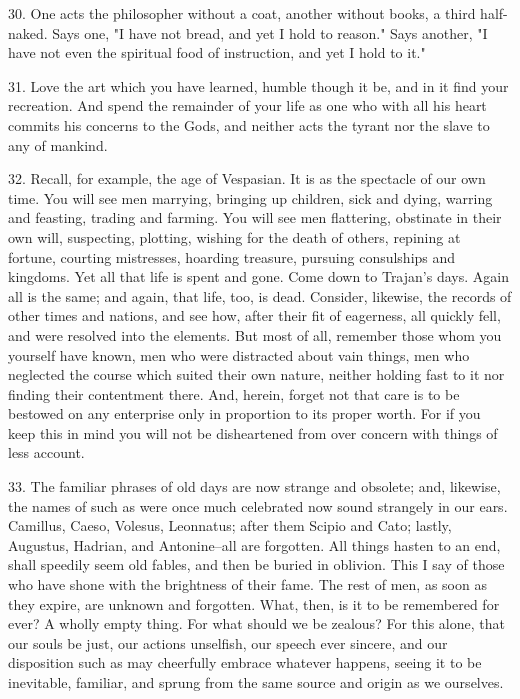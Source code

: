 \documentclass{book}
\begin{document}
30. One acts the philosopher without a coat, another without books, a
third half-naked. Says one, "I have not bread, and yet I hold to
reason." Says another, "I have not even the spiritual food of
instruction, and yet I hold to it."

31. Love the art which you have learned, humble though it be, and in
it find your recreation. And spend the remainder of your life as one
who with all his heart commits his concerns to the Gods, and neither
acts the tyrant nor the slave to any of mankind.

32. Recall, for example, the age of Vespasian. It is as the spectacle
of our own time. You will see men marrying, bringing up children, sick
and dying, warring and feasting, trading and farming. You will see men
flattering, obstinate in their own will, suspecting, plotting, wishing
for the death of others, repining at fortune, courting mistresses,
hoarding treasure, pursuing consulships and kingdoms. Yet all that
life is spent and gone. Come down to Trajan's days. Again all is the
same; and again, that life, too, is dead. Consider, likewise, the
records of other times and nations, and see how, after their fit of
eagerness, all quickly fell, and were resolved into the elements. But
most of all, remember those whom you yourself have known, men who were
distracted about vain things, men who neglected the course which
suited their own nature, neither holding fast to it nor finding their
contentment there. And, herein, forget not that care is to be bestowed
on any enterprise only in proportion to its proper worth. For if you
keep this in mind you will not be disheartened from over concern with
things of less account.

33. The familiar phrases of old days are now strange and obsolete;
and, likewise, the names of such as were once much celebrated now
sound strangely in our ears. Camillus, Caeso, Volesus, Leonnatus;
after them Scipio and Cato; lastly, Augustus, Hadrian, and
Antonine--all are forgotten. All things hasten to an end, shall
speedily seem old fables, and then be buried in oblivion. This I say
of those who have shone with the brightness of their fame. The rest of
men, as soon as they expire, are unknown and forgotten. What, then, is
it to be remembered for ever? A wholly empty thing. For what should we
be zealous? For this alone, that our souls be just, our actions
unselfish, our speech ever sincere, and our disposition such as may
cheerfully embrace whatever happens, seeing it to be inevitable,
familiar, and sprung from the same source and origin as we ourselves.
\end{document}
